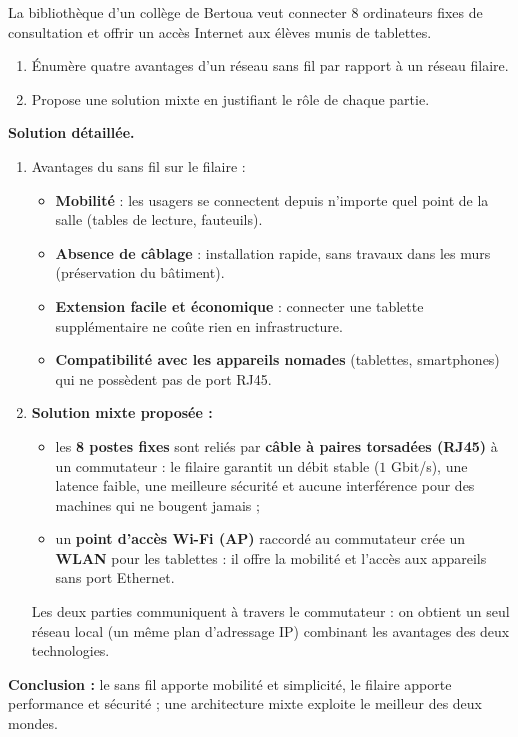 \documentclass[11pt]{article}
\begin{document}
\begin{exoresolu}
La bibliothèque d'un collège de Bertoua veut connecter 8 ordinateurs fixes de consultation et offrir un accès Internet aux élèves munis de tablettes.
\begin{enumerate}
  \item Énumère quatre avantages d'un réseau sans fil par rapport à un réseau filaire.
  \item Propose une solution mixte en justifiant le rôle de chaque partie.
\end{enumerate}
\tcblower
\textbf{Solution détaillée.}
\begin{enumerate}
  \item Avantages du sans fil sur le filaire :
  \begin{itemize}
    \item \textbf{Mobilité} : les usagers se connectent depuis n'importe quel point de la salle (tables de lecture, fauteuils).
    \item \textbf{Absence de câblage} : installation rapide, sans travaux dans les murs (préservation du bâtiment).
    \item \textbf{Extension facile et économique} : connecter une tablette supplémentaire ne coûte rien en infrastructure.
    \item \textbf{Compatibilité avec les appareils nomades} (tablettes, smartphones) qui ne possèdent pas de port RJ45.
  \end{itemize}
  \item \textbf{Solution mixte proposée :}
  \begin{itemize}
    \item les \textbf{8 postes fixes} sont reliés par \textbf{câble à paires torsadées (RJ45)} à un commutateur : le filaire garantit un débit stable ($1$ Gbit/s), une latence faible, une meilleure sécurité et aucune interférence pour des machines qui ne bougent jamais ;
    \item un \textbf{point d'accès Wi-Fi (AP)} raccordé au commutateur crée un \textbf{WLAN} pour les tablettes : il offre la mobilité et l'accès aux appareils sans port Ethernet.
  \end{itemize}
  Les deux parties communiquent à travers le commutateur : on obtient un seul réseau local (un même plan d'adressage IP) combinant les avantages des deux technologies.
\end{enumerate}
\textbf{Conclusion :} le sans fil apporte mobilité et simplicité, le filaire apporte performance et sécurité ; une architecture mixte exploite le meilleur des deux mondes.
\end{exoresolu}
\end{document}

